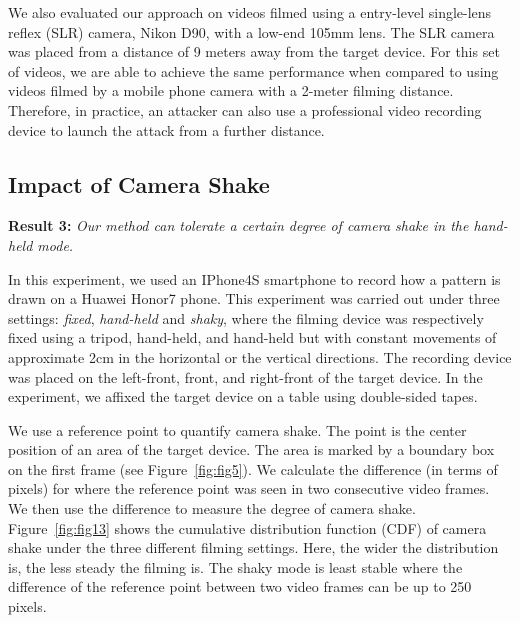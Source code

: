             We also evaluated our approach on videos filmed using a entry-level
            single-lens reflex (SLR) camera, Nikon D90, with a low-end 105mm lens. The SLR camera
            was placed from a distance of 9 meters away from the target
            device. For this set of videos, we are able to achieve the same
            performance when compared to using videos filmed by a mobile
            phone camera with a 2-meter filming distance. 
            Therefore, in practice, an attacker can
            also use a professional video recording device to launch the
            attack from a further distance.

    \vspace{-3mm}
    \subsection{Impact of Camera Shake}

    \noindent \textbf{Result 3:} \emph{Our method can tolerate a certain degree of camera shake in the hand-held mode.}

    In this experiment, we used an IPhone4S smartphone to record how a pattern is drawn on a Huawei Honor7 phone. This experiment was carried out under three settings:
    \emph{fixed}, \emph{hand-held} and \emph{shaky}, where the filming
    device was respectively fixed using a tripod, hand-held, and hand-held but with constant movements of
     approximate 2cm in the horizontal or the vertical directions. The recording device was placed on the left-front, front, and right-front of the target device.
    In the experiment, we affixed the target device on a table using double-sided tapes.



    We use a reference point to quantify camera shake. The point
    is the center position of an area of the target device. The area is marked by a boundary box on the first
    frame (see Figure~\ref{fig:fig5}). We calculate the difference (in terms of pixels) for where the
    reference point was seen in two consecutive video frames. We then use the difference to measure the degree of camera shake.
    Figure~\ref{fig:fig13} shows the cumulative distribution function (CDF)
    of camera shake under the three different filming settings.
    Here, the wider the distribution is, the less steady the
     filming is. The shaky mode is least stable where the difference of the reference point between two video frames can be up to 250 pixels.


